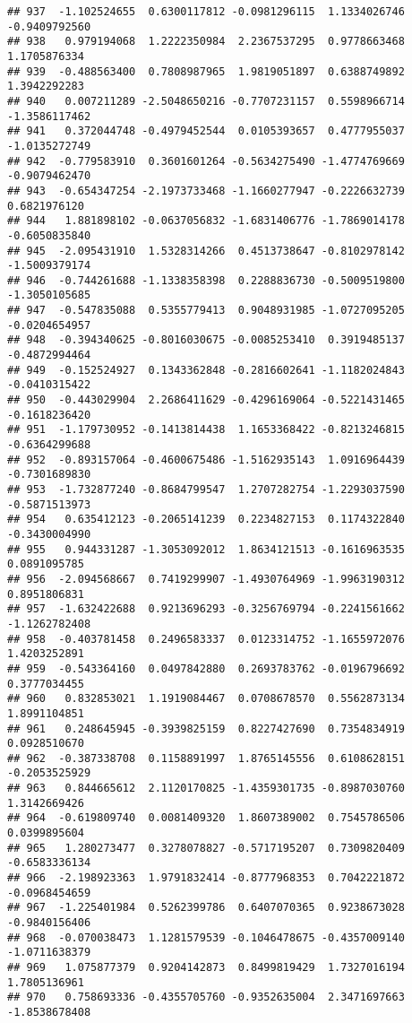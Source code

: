 \documentclass[
]{article}
\begin{document}
\begin{verbatim}
## 937  -1.102524655  0.6300117812 -0.0981296115  1.1334026746 -0.9409792560
## 938   0.979194068  1.2222350984  2.2367537295  0.9778663468  1.1705876334
## 939  -0.488563400  0.7808987965  1.9819051897  0.6388749892  1.3942292283
## 940   0.007211289 -2.5048650216 -0.7707231157  0.5598966714 -1.3586117462
## 941   0.372044748 -0.4979452544  0.0105393657  0.4777955037 -1.0135272749
## 942  -0.779583910  0.3601601264 -0.5634275490 -1.4774769669 -0.9079462470
## 943  -0.654347254 -2.1973733468 -1.1660277947 -0.2226632739  0.6821976120
## 944   1.881898102 -0.0637056832 -1.6831406776 -1.7869014178 -0.6050835840
## 945  -2.095431910  1.5328314266  0.4513738647 -0.8102978142 -1.5009379174
## 946  -0.744261688 -1.1338358398  0.2288836730 -0.5009519800 -1.3050105685
## 947  -0.547835088  0.5355779413  0.9048931985 -1.0727095205 -0.0204654957
## 948  -0.394340625 -0.8016030675 -0.0085253410  0.3919485137 -0.4872994464
## 949  -0.152524927  0.1343362848 -0.2816602641 -1.1182024843 -0.0410315422
## 950  -0.443029904  2.2686411629 -0.4296169064 -0.5221431465 -0.1618236420
## 951  -1.179730952 -0.1413814438  1.1653368422 -0.8213246815 -0.6364299688
## 952  -0.893157064 -0.4600675486 -1.5162935143  1.0916964439 -0.7301689830
## 953  -1.732877240 -0.8684799547  1.2707282754 -1.2293037590 -0.5871513973
## 954   0.635412123 -0.2065141239  0.2234827153  0.1174322840 -0.3430004990
## 955   0.944331287 -1.3053092012  1.8634121513 -0.1616963535  0.0891095785
## 956  -2.094568667  0.7419299907 -1.4930764969 -1.9963190312  0.8951806831
## 957  -1.632422688  0.9213696293 -0.3256769794 -0.2241561662 -1.1262782408
## 958  -0.403781458  0.2496583337  0.0123314752 -1.1655972076  1.4203252891
## 959  -0.543364160  0.0497842880  0.2693783762 -0.0196796692  0.3777034455
## 960   0.832853021  1.1919084467  0.0708678570  0.5562873134  1.8991104851
## 961   0.248645945 -0.3939825159  0.8227427690  0.7354834919  0.0928510670
## 962  -0.387338708  0.1158891997  1.8765145556  0.6108628151 -0.2053525929
## 963   0.844665612  2.1120170825 -1.4359301735 -0.8987030760  1.3142669426
## 964  -0.619809740  0.0081409320  1.8607389002  0.7545786506  0.0399895604
## 965   1.280273477  0.3278078827 -0.5717195207  0.7309820409 -0.6583336134
## 966  -2.198923363  1.9791832414 -0.8777968353  0.7042221872 -0.0968454659
## 967  -1.225401984  0.5262399786  0.6407070365  0.9238673028 -0.9840156406
## 968  -0.070038473  1.1281579539 -0.1046478675 -0.4357009140 -1.0711638379
## 969   1.075877379  0.9204142873  0.8499819429  1.7327016194  1.7805136961
## 970   0.758693336 -0.4355705760 -0.9352635004  2.3471697663 -1.8538678408

\end{verbatim}
\end{document}
